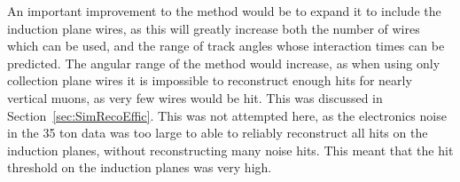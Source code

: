 
An important improvement to the method would be to expand it to include the induction plane wires, as this will greatly increase both the number of wires which can be used, and the range of track angles whose interaction times can be predicted. The angular range of the method would increase, as when using only collection plane wires it is impossible to reconstruct enough hits for nearly vertical muons, as very few wires would be hit. This was discussed in Section~\ref{sec:SimRecoEffic}. This was not attempted here, as the electronics noise in the 35 ton data was too large to able to reliably reconstruct all hits on the induction planes, without reconstructing many noise hits. This meant that the hit threshold on the induction planes was very high. \\
